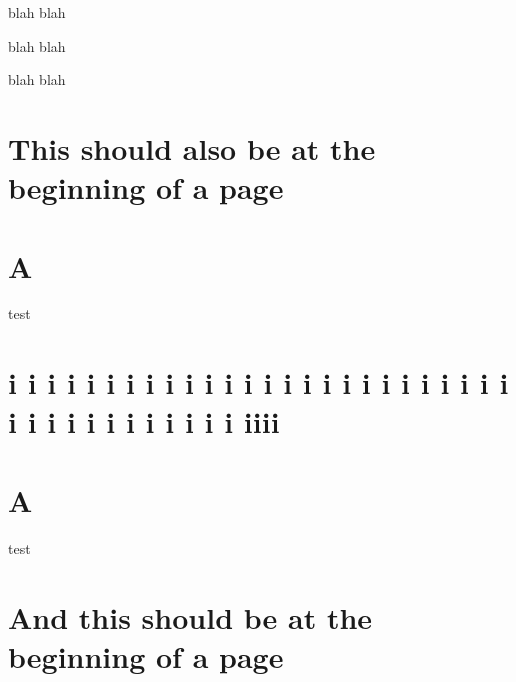 \documentclass[baselinegrid,noprint,nocopyright]{uit-thesis-test}
\begin{document}
blah blah

blah blah

blah blah



\section{This should also be at the beginning of a page}
\section{A}
test

\section{i i i i i i i i i i i i i i i i i i i i i i i i i i i i i i i i i i i i i i iiii}
\section{A}
test

\newpage
\section{And this should be at the beginning of a page}
\end{document}
